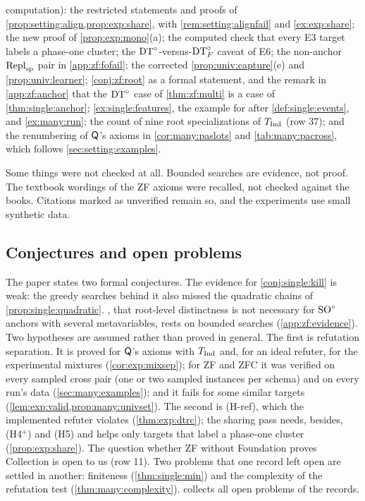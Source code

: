 \begin{itemize}
  computation): the restricted statements and proofs of \cref{prop:setting:align,prop:exp:share}, with
  \cref{rem:setting:alignfail} and \cref{ex:exp:share}; the new proof of \cref{prop:exp:mono}(a); the computed check that
  every E3 target labels a phase-one cluster; the $\mathrm{DT}^{\circ}$-versus-$\mathrm{DT}^{\circ}_{F}$ caveat of E6; the non-anchor $\mathrm{Repl}_{\mathrm{sp}}$ pair in
  \cref{app:zf:fofail}; the corrected \cref{prop:univ:capture}(e) and \cref{prop:univ:learner}; \cref{conj:zf:root} as a
  formal statement, and the remark in \cref{app:zf:anchor} that the $\mathrm{DT}^{\circ}$ case of \cref{thm:zf:multi} is a case of
  \cref{thm:single:anchor}; \cref{ex:single:features}, the example for \evU{} after \cref{def:single:events}, and
  \cref{ex:many:run}; the count of nine root specializations of $T_{\mathrm{Ind}}$ (row 37); and the renumbering of $\mathsf{Q}$'s
  axioms in \cref{cor:many:paslots} and \cref{tab:many:pacross}, which follows \cref{sec:setting:examples}.
\end{itemize}
Some things were not checked at all. Bounded searches are evidence, not proof. The textbook wordings of the ZF axioms
were recalled, not checked against the books. Citations marked as unverified remain so, and the experiments use small
synthetic data.

\subsection{Conjectures and open problems}\label{app:ver:open}

The paper states two formal conjectures. The evidence for \cref{conj:single:kill} is weak: the greedy searches behind
it also missed the quadratic chains of \cref{prop:single:quadratic}. , that root-level distinctness
is not necessary for $\mathrm{SO}^{\circ}$ anchors with several metavariables, rests on bounded searches (\cref{app:zf:evidence}). Two
hypotheses are assumed rather than proved in general. The first is refutation separation. It is proved for $\mathsf{Q}$'s
axioms with $T_{\mathrm{Ind}}$ and, for an ideal refuter, for the experimental mixtures (\cref{cor:exp:mixsep}); for ZF and ZFC it
was verified on every sampled cross pair (one or two sampled instances per schema) and on every run's data
(\cref{sec:many:examples}); and it fails for some similar targets (\cref{lem:exp:valid,prop:many:univset}). The second is
(H-ref), which the implemented refuter violates (\cref{thm:exp:dtrc}); the sharing pass needs, besides, (H4$^+$) and (H5)
and helps only targets that label a phase-one cluster (\cref{prop:exp:share}). The question whether ZF without Foundation proves Collection is open to us (row 11). Two problems
that one record left open are settled in another: finiteness (\cref{thm:single:min}) and the complexity of the
refutation test (\cref{thm:many:complexity}).  collects all open problems of the records.

